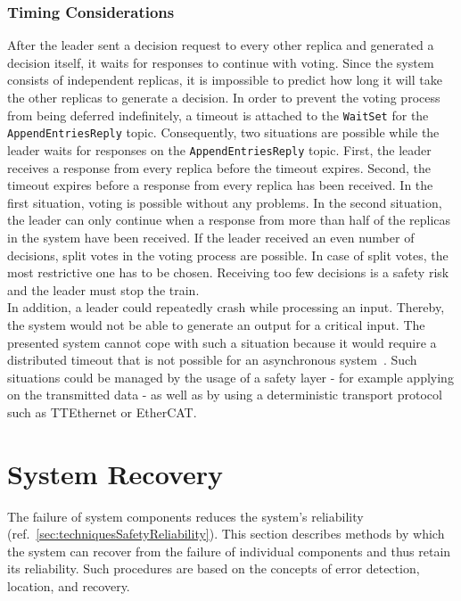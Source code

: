 \subsubsection{Timing Considerations}

After the leader sent a decision request to every other replica and generated a decision itself, it waits for responses to continue with voting.
Since the system consists of independent replicas, it is impossible to predict how long it will take the other replicas to generate a decision.
In order to prevent the voting process from being deferred indefinitely, a timeout is attached to the \texttt{WaitSet} for the \texttt{AppendEntriesReply} topic.
Consequently, two situations are possible while the leader waits for responses on the \texttt{AppendEntriesReply} topic.
First, the leader receives a response from every replica before the timeout expires.
Second, the timeout expires before a response from every replica has been received.
In the first situation, voting is possible without any problems.
In the second situation, the leader can only continue when a response from more than half of the replicas in the system have been received.
If the leader received an even number of decisions, split votes in the voting process are possible.
In case of split votes, the most restrictive one has to be chosen.
Receiving too few decisions is a safety risk and the leader must stop the train.
\\

\noindent
In addition, a leader could repeatedly crash while processing an input.
Thereby, the system would not be able to generate an output for a critical input.
The presented system cannot cope with such a situation because it would require a distributed timeout that is not possible for an asynchronous system~\cite{FLPProblemConsensus}.
Such situations could be managed by the usage of a safety layer - for example applying  on the transmitted data -  as well as by using a deterministic transport protocol~\cite{DeterministicTransport} such as TTEthernet or EtherCAT.

\section{System Recovery}

The failure of system components reduces the system's reliability (ref.~\autoref{sec:techniquesSafetyReliability}).
This section describes methods by which the system can recover from the failure of individual components and thus retain its reliability.
Such procedures are based on the concepts of error detection, location, and recovery.
\\

